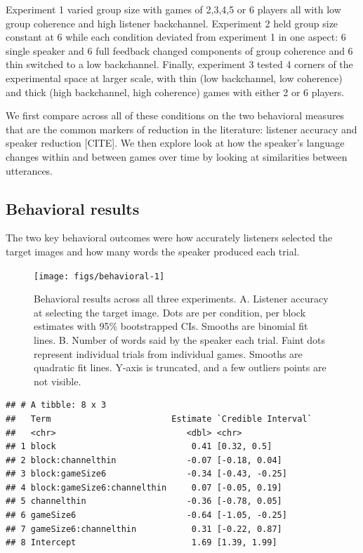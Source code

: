 \documentclass[
  english,
  a4paper,
]{article}
\begin{document}
Experiment 1 varied group size with games of 2,3,4,5 or 6 players all with low group coherence and high listener backchannel. Experiment 2 held group size constant at 6 while each condition deviated from experiment 1 in one aspect: 6 single speaker and 6 full feedback changed components of group coherence and 6 thin switched to a low backchannel. Finally, experiment 3 tested 4 corners of the experimental space at larger scale, with thin (low backchannel, low coherence) and thick (high backchannel, high coherence) games with either 2 or 6 players.

We first compare across all of these conditions on the two behavioral measures that are the common markers of reduction in the literature: listener accuracy and speaker reduction {[}CITE{]}. We then explore look at how the speaker's language changes within and between games over time by looking at similarities between utterances.

\hypertarget{behavioral-results}{%
\subsection{Behavioral results}\label{behavioral-results}}

The two key behavioral outcomes were how accurately listeners selected the target images and how many words the speaker produced each trial.

\begin{figure}[t!]

{\centering \texttt{[image: figs/behavioral-1]} 

}

\caption{Behavioral results across all three experiments. A. Listener accuracy at selecting the target image. Dots are per condition, per block estimates with 95\% bootstrapped CIs. Smooths are binomial fit lines. B. Number of words said by the speaker each trial. Faint dots represent individual trials from individual games. Smooths are quadratic fit lines. Y-axis is truncated, and a few outliers points are not visible. }\label{fig:behavioral}
\end{figure}

\begin{verbatim}
## # A tibble: 8 x 3
##   Term                        Estimate `Credible Interval`
##   <chr>                          <dbl> <chr>              
## 1 block                           0.41 [0.32, 0.5]        
## 2 block:channelthin              -0.07 [-0.18, 0.04]      
## 3 block:gameSize6                -0.34 [-0.43, -0.25]     
## 4 block:gameSize6:channelthin     0.07 [-0.05, 0.19]      
## 5 channelthin                    -0.36 [-0.78, 0.05]      
## 6 gameSize6                      -0.64 [-1.05, -0.25]     
## 7 gameSize6:channelthin           0.31 [-0.22, 0.87]      
## 8 Intercept                       1.69 [1.39, 1.99]
\end{verbatim}
\end{document}
